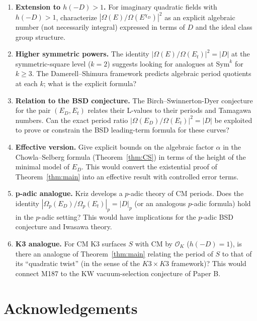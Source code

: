 \documentclass[12pt,a4paper]{article}
\theoremstyle{plain}
\theoremstyle{definition}
\newcommand{\OK}{\mathcal{O}_K}
\begin{document}
\begin{enumerate}

\item \textbf{Extension to $h(-D) > 1$.}
For imaginary quadratic fields with $h(-D) > 1$, characterize
$|\Omega(E)/\Omega(E^{\chi_D})|^2$ as an explicit algebraic number (not
necessarily integral) expressed in terms of $D$ and the ideal class group
structure.

\item \textbf{Higher symmetric powers.}
The identity $|\Omega(E)/\Omega(E_t)|^2 = |D|$ at the symmetric-square level
($k = 2$) suggests looking for analogues at $\mathrm{Sym}^k$ for $k \ge 3$.
The Damerell--Shimura framework predicts algebraic period quotients at each
$k$; what is the explicit formula?

\item \textbf{Relation to the BSD conjecture.}
The Birch--Swinnerton-Dyer conjecture for the pair $(E_D, E_t)$ relates
their L-values to their periods and Tamagawa numbers.  Can the exact
period ratio $|\Omega(E_D)/\Omega(E_t)|^2 = |D|$ be exploited to prove or
constrain the BSD leading-term formula for these curves?

\item \textbf{Effective version.}
Give explicit bounds on the algebraic factor $\alpha$ in the Chowla--Selberg
formula (Theorem~\ref{thm:CS}) in terms of the height of the minimal model
of $E_D$.  This would convert the existential proof of Theorem~\ref{thm:main}
into an effective result with controlled error terms.

\item \textbf{p-adic analogue.}
Kriz \cite{Kriz1805.03605} develops a $p$-adic theory of CM periods.
Does the identity $|\Omega_p(E_D)/\Omega_p(E_t)|_p = |D|_p$ (or an analogous
$p$-adic formula) hold in the $p$-adic setting?  This would have implications
for the $p$-adic BSD conjecture and Iwasawa theory.

\item \textbf{K3 analogue.}
For CM K3 surfaces $S$ with CM by $\OK$ ($h(-D) = 1$), is there an analogue
of Theorem~\ref{thm:main} relating the period of $S$ to that of its
``quadratic twist'' (in the sense of the $K3 \times K3$ framework)?  This
would connect M187 to the KW vacuum-selection conjecture of Paper B.

\end{enumerate}

\section*{Acknowledgements}
\end{document}
